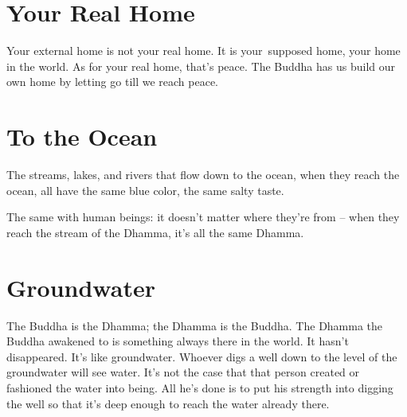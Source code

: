 
\thispagestyle{empty}

\vspace*{-\headsep}
\noindent%
\begin{minipage}[c][\textheight][c]{\linewidth}

\noindent%
\begin{minipage}{\linewidth}
\raggedright

\section{Your Real Home}

Your external home is not your real home. It is your\linebreak\ supposed home, your home in the world. As for your real home, that's peace. The Buddha has us build our own home by letting go till we reach peace.

\end{minipage}

\end{minipage}


\clearpage

\section{To the Ocean}

The streams, lakes, and rivers that flow down to the ocean, when they reach the ocean, all have the same blue color, the same salty taste.

The same with human beings: it doesn't matter where they're from -- when they reach the stream of the Dhamma, it's all the same Dhamma.

\section{Groundwater}

The Buddha is the Dhamma; the Dhamma is the Buddha. The Dhamma the Buddha awakened to is something always there in the world. It hasn't disappeared. It's like groundwater. Whoever digs a well down to the level of the groundwater will see water. It's not the case that that person created or fashioned the water into being. All he's done is to put his strength into digging the well so that it's deep enough to reach the water already there.

